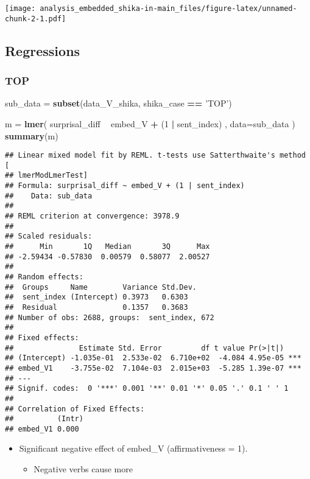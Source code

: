 \documentclass[]{ltjsarticle}
\newenvironment{Shaded}{\begin{snugshade}}{\end{snugshade}}
\newcommand{\KeywordTok}[1]{\textcolor[rgb]{0.13,0.29,0.53}{\textbf{#1}}}
\newcommand{\DataTypeTok}[1]{\textcolor[rgb]{0.13,0.29,0.53}{#1}}
\newcommand{\DecValTok}[1]{\textcolor[rgb]{0.00,0.00,0.81}{#1}}
\newcommand{\StringTok}[1]{\textcolor[rgb]{0.31,0.60,0.02}{#1}}
\newcommand{\OperatorTok}[1]{\textcolor[rgb]{0.81,0.36,0.00}{\textbf{#1}}}
\newcommand{\NormalTok}[1]{#1}
\providecommand{\tightlist}{%
  \setlength{\itemsep}{0pt}\setlength{\parskip}{0pt}}
\begin{document}
\texttt{[image: analysis\_embedded\_shika-in-main\_files/figure-latex/unnamed-chunk-2-1.pdf]}

\subsection{Regressions}\label{regressions}

\subsubsection{TOP}\label{top}

\begin{Shaded}
\begin{Highlighting}[]
\NormalTok{sub_data =}\StringTok{ }\KeywordTok{subset}\NormalTok{(data_V_shika, shika_case }\OperatorTok{==}\StringTok{ 'TOP'}\NormalTok{)}

\NormalTok{m =}\StringTok{ }\KeywordTok{lmer}\NormalTok{(}
\NormalTok{        surprisal_diff}
            \OperatorTok{~}\StringTok{ }\NormalTok{embed_V}
                \OperatorTok{+}\StringTok{ }\NormalTok{(}\DecValTok{1} \OperatorTok{|}\StringTok{ }\NormalTok{sent_index)}
\NormalTok{        ,}
        \DataTypeTok{data=}\NormalTok{sub_data}
\NormalTok{        )}
\KeywordTok{summary}\NormalTok{(m)}
\end{Highlighting}
\end{Shaded}

\begin{verbatim}
## Linear mixed model fit by REML. t-tests use Satterthwaite's method [
## lmerModLmerTest]
## Formula: surprisal_diff ~ embed_V + (1 | sent_index)
##    Data: sub_data
## 
## REML criterion at convergence: 3978.9
## 
## Scaled residuals: 
##      Min       1Q   Median       3Q      Max 
## -2.59434 -0.57830  0.00579  0.58077  2.00527 
## 
## Random effects:
##  Groups     Name        Variance Std.Dev.
##  sent_index (Intercept) 0.3973   0.6303  
##  Residual               0.1357   0.3683  
## Number of obs: 2688, groups:  sent_index, 672
## 
## Fixed effects:
##               Estimate Std. Error         df t value Pr(>|t|)    
## (Intercept) -1.035e-01  2.533e-02  6.710e+02  -4.084 4.95e-05 ***
## embed_V1    -3.755e-02  7.104e-03  2.015e+03  -5.285 1.39e-07 ***
## ---
## Signif. codes:  0 '***' 0.001 '**' 0.01 '*' 0.05 '.' 0.1 ' ' 1
## 
## Correlation of Fixed Effects:
##          (Intr)
## embed_V1 0.000
\end{verbatim}

\begin{itemize}
\tightlist
\item
  Significant negative effect of embed\_V (affirmativeness = 1).

  \begin{itemize}
  \tightlist
  \item
    Negative verbs cause more
  \end{itemize}
\end{itemize}
\end{document}
